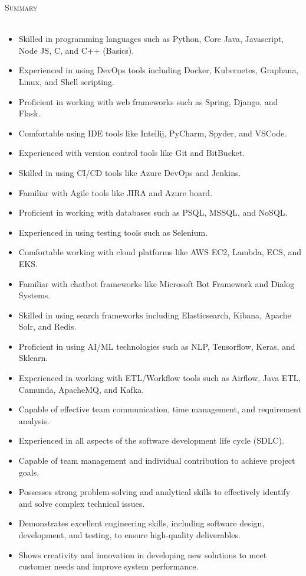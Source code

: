 \documentclass[a4paper]{article}
\newcommand{\lineunder} {
    \vspace*{-8pt} \\
    \hspace*{-18pt} \hrulefill \\
}
\newcommand{\header} [1] {
    {\hspace*{-18pt}\vspace*{6pt} \textsc{#1}}
    \vspace*{-6pt} \lineunder
}
\begin{document}
\header{Summary}
\begin{itemize} \itemsep 1pt
   \item Skilled in programming languages such as Python, Core Java, Javascript, Node JS, C, and C++ (Basics).
\item Experienced in using DevOps tools including Docker, Kubernetes, Graphana, Linux, and Shell scripting.
\item Proficient in working with web frameworks such as Spring, Django, and Flask.
\item Comfortable using IDE tools like Intellij, PyCharm, Spyder, and VSCode.
\item Experienced with version control tools like Git and BitBucket.
\item Skilled in using CI/CD tools like Azure DevOps and Jenkins.
\item Familiar with Agile tools like JIRA and Azure board.
\item Proficient in working with databases such as PSQL, MSSQL, and NoSQL.
\item Experienced in using testing tools such as Selenium.
\item Comfortable working with cloud platforms like AWS EC2, Lambda, ECS, and EKS.
\item Familiar with chatbot frameworks like Microsoft Bot Framework and Dialog Systems.
\item Skilled in using search frameworks including Elasticsearch, Kibana, Apache Solr, and Redis.
\item Proficient in using AI/ML technologies such as NLP, Tensorflow, Keras, and Sklearn.
\item Experienced in working with ETL/Workflow tools such as Airflow, Java ETL, Camunda, ApacheMQ, and Kafka.
\item Capable of effective team communication, time management, and requirement analysis.
\item Experienced in all aspects of the software development life cycle (SDLC).
\item Capable of team management and individual contribution to achieve project goals.
\item Possesses strong problem-solving and analytical skills to effectively identify and solve complex technical issues.
\item Demonstrates excellent engineering skills, including software design, development, and testing, to ensure high-quality deliverables.
\item Shows creativity and innovation in developing new solutions to meet customer needs and improve system performance.
\end{itemize}
\end{document}
